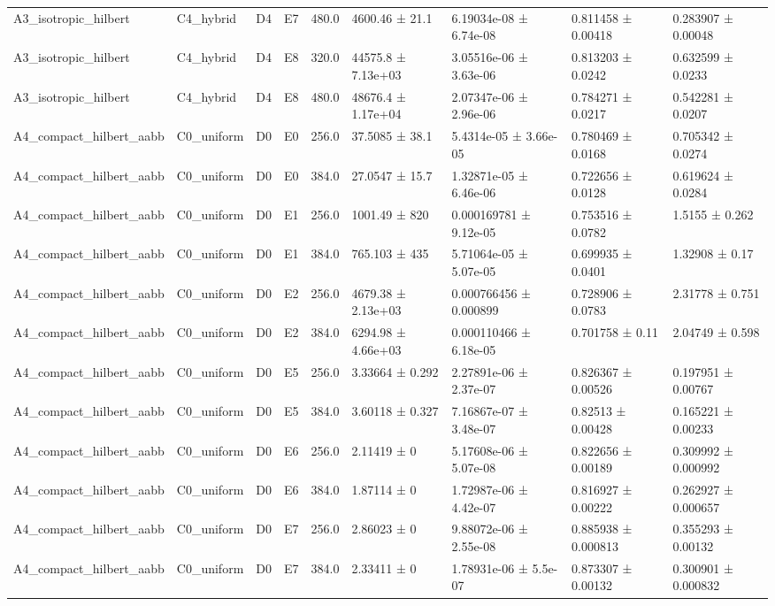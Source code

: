 \begin{table}
\begin{tabular}{lllllllll}
A3\_isotropic\_hilbert & C4\_hybrid & D4 & E7 & 480.0 & 4600.46 ± 21.1 & 6.19034e-08 ± 6.74e-08 & 0.811458 ± 0.00418 & 0.283907 ± 0.00048 \\
A3\_isotropic\_hilbert & C4\_hybrid & D4 & E8 & 320.0 & 44575.8 ± 7.13e+03 & 3.05516e-06 ± 3.63e-06 & 0.813203 ± 0.0242 & 0.632599 ± 0.0233 \\
A3\_isotropic\_hilbert & C4\_hybrid & D4 & E8 & 480.0 & 48676.4 ± 1.17e+04 & 2.07347e-06 ± 2.96e-06 & 0.784271 ± 0.0217 & 0.542281 ± 0.0207 \\
A4\_compact\_hilbert\_aabb & C0\_uniform & D0 & E0 & 256.0 & 37.5085 ± 38.1 & 5.4314e-05 ± 3.66e-05 & 0.780469 ± 0.0168 & 0.705342 ± 0.0274 \\
A4\_compact\_hilbert\_aabb & C0\_uniform & D0 & E0 & 384.0 & 27.0547 ± 15.7 & 1.32871e-05 ± 6.46e-06 & 0.722656 ± 0.0128 & 0.619624 ± 0.0284 \\
A4\_compact\_hilbert\_aabb & C0\_uniform & D0 & E1 & 256.0 & 1001.49 ± 820 & 0.000169781 ± 9.12e-05 & 0.753516 ± 0.0782 & 1.5155 ± 0.262 \\
A4\_compact\_hilbert\_aabb & C0\_uniform & D0 & E1 & 384.0 & 765.103 ± 435 & 5.71064e-05 ± 5.07e-05 & 0.699935 ± 0.0401 & 1.32908 ± 0.17 \\
A4\_compact\_hilbert\_aabb & C0\_uniform & D0 & E2 & 256.0 & 4679.38 ± 2.13e+03 & 0.000766456 ± 0.000899 & 0.728906 ± 0.0783 & 2.31778 ± 0.751 \\
A4\_compact\_hilbert\_aabb & C0\_uniform & D0 & E2 & 384.0 & 6294.98 ± 4.66e+03 & 0.000110466 ± 6.18e-05 & 0.701758 ± 0.11 & 2.04749 ± 0.598 \\
A4\_compact\_hilbert\_aabb & C0\_uniform & D0 & E5 & 256.0 & 3.33664 ± 0.292 & 2.27891e-06 ± 2.37e-07 & 0.826367 ± 0.00526 & 0.197951 ± 0.00767 \\
A4\_compact\_hilbert\_aabb & C0\_uniform & D0 & E5 & 384.0 & 3.60118 ± 0.327 & 7.16867e-07 ± 3.48e-07 & 0.82513 ± 0.00428 & 0.165221 ± 0.00233 \\
A4\_compact\_hilbert\_aabb & C0\_uniform & D0 & E6 & 256.0 & 2.11419 ± 0 & 5.17608e-06 ± 5.07e-08 & 0.822656 ± 0.00189 & 0.309992 ± 0.000992 \\
A4\_compact\_hilbert\_aabb & C0\_uniform & D0 & E6 & 384.0 & 1.87114 ± 0 & 1.72987e-06 ± 4.42e-07 & 0.816927 ± 0.00222 & 0.262927 ± 0.000657 \\
A4\_compact\_hilbert\_aabb & C0\_uniform & D0 & E7 & 256.0 & 2.86023 ± 0 & 9.88072e-06 ± 2.55e-08 & 0.885938 ± 0.000813 & 0.355293 ± 0.00132 \\
A4\_compact\_hilbert\_aabb & C0\_uniform & D0 & E7 & 384.0 & 2.33411 ± 0 & 1.78931e-06 ± 5.5e-07 & 0.873307 ± 0.00132 & 0.300901 ± 0.000832 \\

\end{tabular}
\end{table}
